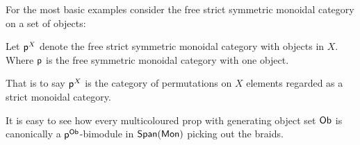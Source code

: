 For the most basic examples consider the free strict symmetric monoidal category on a set of objects:
\begin{definition}
Let $\P^X$ denote the free strict symmetric monoidal category with objects in $X$. Where $\P$ is the free symmetric monoidal category with one object.

That is to say $\P^X$ is the category of permutations on $X$ elements regarded as a strict monoidal category.
\end{definition}
%
%
%
%
%
%
%
%
%
%
It is easy to see how every multicoloured prop with generating object set $\sf Ob$ is canonically a $\P^{\sf Ob}$-bimodule in $\Span(\Mon)$ picking out the braids.


